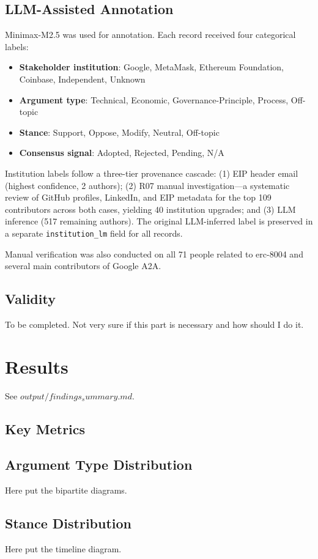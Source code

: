 \documentclass[conference]{IEEEtran}
\begin{document}
\subsection{LLM-Assisted Annotation}
Minimax-M2.5 was used for annotation. Each record received four categorical labels:
\begin{itemize}
  \item \textbf{Stakeholder institution}: Google, MetaMask, Ethereum
        Foundation, Coinbase, Independent, Unknown
  \item \textbf{Argument type}: Technical, Economic, Governance-Principle, Process, Off-topic
  \item \textbf{Stance}: Support, Oppose, Modify, Neutral, Off-topic
  \item \textbf{Consensus signal}: Adopted, Rejected, Pending, N/A
\end{itemize}
Institution labels follow a three-tier provenance cascade: (1) EIP header email (highest confidence, 2 authors); (2) R07 manual investigation---a systematic review of GitHub profiles, LinkedIn, and EIP metadata for the top 109 contributors across both cases, yielding 40 institution upgrades; and (3) LLM inference (517 remaining authors). The original LLM-inferred label is preserved in a separate \texttt{institution\_lm} field for all records.

Manual verification was also conducted on all 71 people related to erc-8004 and several main contributors of Google A2A. 

\subsection{Validity}
To be completed. Not very sure if this part is necessary and how should I do it. 

\section{Results}
See $output/findings_summary.md$.
\subsection{Key Metrics}

\subsection{Argument Type Distribution}
Here put the bipartite diagrams.

\subsection{Stance Distribution}
Here put the timeline diagram.
\end{document}
